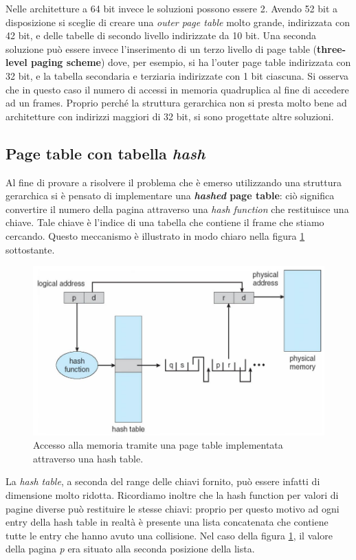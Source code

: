 Nelle architetture a 64 bit invece le soluzioni possono essere 2. Avendo 52 bit a disposizione si sceglie di creare una \textit{outer page table} molto grande, indirizzata con 42 bit, e delle tabelle di secondo livello indirizzate da 10 bit. Una seconda soluzione può essere invece l'inserimento di un terzo livello di page table (\textbf{three-level paging scheme}) dove, per esempio, si ha l'outer page table indirizzata con 32 bit, e la tabella secondaria e terziaria indirizzate con 1 bit ciascuna. Si osserva che in questo caso il numero di accessi in memoria quadruplica al fine di accedere ad un frames. Proprio perché la struttura gerarchica non si presta molto bene ad architetture con indirizzi maggiori di 32 bit, si sono progettate altre soluzioni.

% 
\subsection{Page table con tabella \textit{hash}}
Al fine di provare a risolvere il problema che è emerso utilizzando una struttura gerarchica si è pensato di implementare una \textbf{\textit{hashed} page table}: ciò significa convertire il numero della pagina attraverso una \textit{hash function} che restituisce una chiave. Tale chiave è l'indice di una tabella che contiene il frame che stiamo cercando. Questo meccanismo è illustrato in modo chiaro nella figura \ref{fig:hashed_page_table} sottostante. 
\begin{figure}[h]
    \centering
    \includegraphics[width = .7\textwidth]{../res/imgs/main memory/hashed_page_table.png}
    \caption{Accesso alla memoria tramite una page table implementata attraverso una hash table.}
    \label{fig:hashed_page_table}
\end{figure}
La \textit{hash table}, a seconda del range delle chiavi fornito, può essere infatti di dimensione molto ridotta. Ricordiamo inoltre che la hash function per valori di pagine diverse può restituire le stesse chiavi: proprio per questo motivo ad ogni entry della hash table in realtà è presente una lista concatenata che contiene tutte le entry che hanno avuto una collisione. Nel caso della figura \ref{fig:hashed_page_table}, il valore della pagina \textit{p} era situato alla seconda posizione della lista. 

